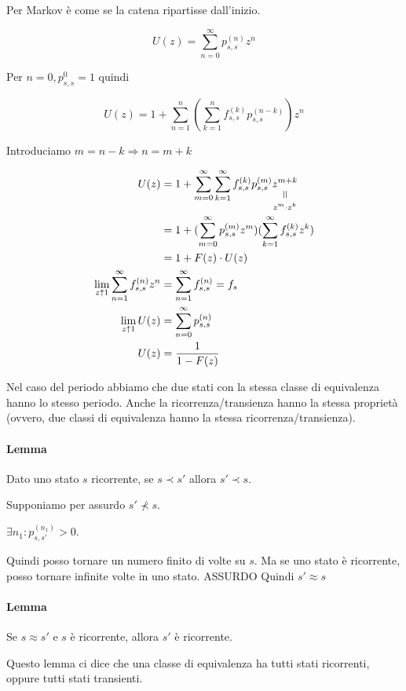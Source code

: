 \documentclass[a4paper,12pt]{book}
\newcommand{\verteq}{\rotatebox{90}{$\,=$}}
\newcommand{\equalto}[2]{\underset{\scriptstyle\overset{\mkern4mu\verteq}{#2}}{#1}}
\begin{document}
Per Markov è come se la catena ripartisse dall'inizio. 


 $$ U(z) = \sum_{n=0}^{\infty} p_{s,s}^{(n)} z^n $$
 
Per $ n = 0, p_{s,s}^0 = 1 $ quindi 

$$ U(z)	= 1 + \sum_{n=1}^{n} (\sum_{k=1}^{n} f_{s,s}^{(k)} p_{s,s}^{(n-k)}) z^n $$

Introduciamo $ m = n-k \Rightarrow n=m+k $

\begin{align*}
	U(z) & = 1 + \sum_{m=0}^{\infty} \sum_{k=1}^{\infty} f_{s,s}^{(k)} p_{s,s}^{(m)} \equalto{z^{m+k}}{z^m\cdot z^k} \\
	& = 1 + (\sum_{m=0}^{\infty}p_{s,s}^{(m)} z^m )(\sum_{k=1}^{\infty} f_{s,s}^{(k)}z^k ) \\
	& = 1 + F(z)\cdot U(z) \\
	\lim\limits_{z \uparrow 1} \sum_{n=1}^{\infty} f_{s,s}^{(n)} z^n & = \sum_{n=1}^{\infty} f_{s,s}^{(n)} = f_s \\
	\lim\limits_{z \uparrow 1} U(z) & = \sum_{n=0}^{\infty} p_{s,s}^{(n)} \\
	U(z) & = \frac{1}{1 - F(z)}
\end{align*}

Nel caso del periodo abbiamo che due stati con la stessa classe di equivalenza hanno lo stesso periodo. Anche la ricorrenza/transienza hanno la stessa proprietà (ovvero, due classi di equivalenza hanno la stessa ricorrenza/transienza). 

\paragraph{Lemma} Dato uno stato $ s $ ricorrente, se $ s \prec s' $ allora $ s' \prec s $.

Supponiamo per assurdo $ s' \nprec s $.

$ \exists n_1 : p_{s,s'}^{(n_1)} > 0$.

Quindi posso tornare un numero finito di volte su $ s $. Ma se uno stato è ricorrente, posso tornare infinite volte in uno stato. ASSURDO
Quindi $ s' \approx s $

\paragraph{Lemma} Se $ s \approx s' $ e $ s $ è ricorrente, allora $ s' $ è ricorrente. 

Questo lemma ci dice che una classe di equivalenza ha tutti stati ricorrenti, oppure tutti stati transienti. 
\end{document}
